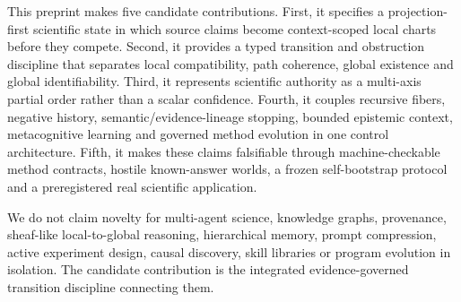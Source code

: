 This preprint makes five candidate contributions. First, it specifies a projection-first scientific state in which source claims become context-scoped local charts before they compete. Second, it provides a typed transition and obstruction discipline that separates local compatibility, path coherence, global existence and global identifiability. Third, it represents scientific authority as a multi-axis partial order rather than a scalar confidence. Fourth, it couples recursive fibers, negative history, semantic/evidence-lineage stopping, bounded epistemic context, metacognitive learning and governed method evolution in one control architecture. Fifth, it makes these claims falsifiable through machine-checkable method contracts, hostile known-answer worlds, a frozen self-bootstrap protocol and a preregistered real scientific application.

We do not claim novelty for multi-agent science, knowledge graphs, provenance, sheaf-like local-to-global reasoning, hierarchical memory, prompt compression, active experiment design, causal discovery, skill libraries or program evolution in isolation. The candidate contribution is the integrated evidence-governed transition discipline connecting them.

